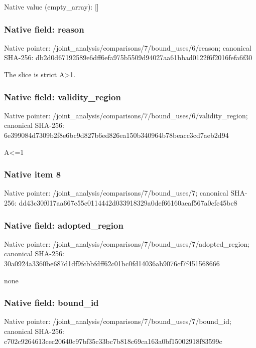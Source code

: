 \documentclass[10pt,a4paper]{article}
\begin{document}
Native value (empty\_\allowbreak{}array): []

\subsubsection{Native field: reason}
Native pointer: /joint\_\allowbreak{}analysis/comparisons/7/bound\_\allowbreak{}uses/6/reason; canonical SHA-256: db2d0d67192589e6dff6efa975b5509d94027aa61bbad0122f6f2016fefa6f30

\begingroup\raggedright\sloppy The slice is strict A>1.\par\endgroup

\subsubsection{Native field: validity\_\allowbreak{}region}
Native pointer: /joint\_\allowbreak{}analysis/comparisons/7/bound\_\allowbreak{}uses/6/validity\_\allowbreak{}region; canonical SHA-256: 6e399084d7309b2f8e6bc9d827b6ed826ea150b340964b78beacc3cd7aeb2d94

\begingroup\raggedright\sloppy A<=\allowbreak{}1\par\endgroup

\subsubsection{Native item 8}
Native pointer: /joint\_\allowbreak{}analysis/comparisons/7/bound\_\allowbreak{}uses/7; canonical SHA-256: dd43c30f017aa667c55c0114442d033918329a0def66160aeaf567a0cfc45bc8

\subsubsection{Native field: adopted\_\allowbreak{}region}
Native pointer: /joint\_\allowbreak{}analysis/comparisons/7/bound\_\allowbreak{}uses/7/adopted\_\allowbreak{}region; canonical SHA-256: 30a0924a3360be687d1df9fcbbfdff62c01bc0fd14036ab9076cf7f451568666

\begingroup\raggedright\sloppy none\par\endgroup

\subsubsection{Native field: bound\_\allowbreak{}id}
Native pointer: /joint\_\allowbreak{}analysis/comparisons/7/bound\_\allowbreak{}uses/7/bound\_\allowbreak{}id; canonical SHA-256: c702c9264613cec20640c97bf35c33bc7b818c69ca163a0bf15002918f83599c
\end{document}
